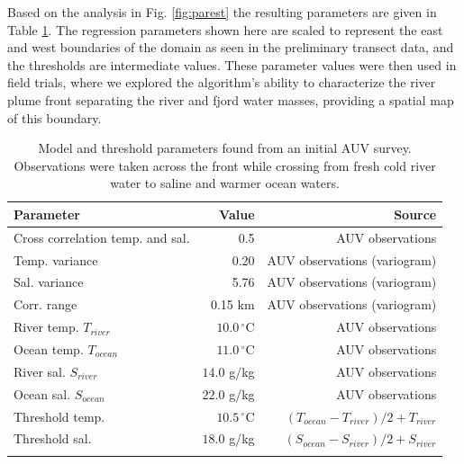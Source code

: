 \documentclass[aoas]{imsart}
\begin{document}
Based on the analysis in Fig. \ref{fig:parest} the resulting parameters are given in Table \ref{tab:experiment_param}. The regression parameters shown here are scaled to represent the east and west boundaries of the domain as seen in the preliminary transect data, and the thresholds are intermediate values. These parameter values were then used in field trials, where we explored the algorithm's ability to characterize the river plume front separating the river and fjord water masses, providing a spatial map of this boundary. 


\begin{table}[!h]
\centering
\begin{tabular}{lrr}
\toprule
Parameter & Value & Source\\
\midrule
\rowcolor{Gray}
Cross correlation temp. and sal. & 0.5 & AUV observations\\
Temp. variance &  0.20 & AUV observations (variogram)\\
\rowcolor{Gray}
Sal. variance &  5.76 & AUV observations (variogram)\\
Corr. range  & 0.15 km & AUV observations (variogram)\\
\rowcolor{Gray}
River temp. $T_{river}$ & $10.0\,^{\circ}\mathrm{C}$ & AUV observations\\
Ocean temp. $T_{ocean}$ & $11.0\,^{\circ}\mathrm{C}$ & AUV observations\\
\rowcolor{Gray}
River sal. $S_{river}$ & $14.0$ g/kg & AUV observations\\
Ocean sal. $S_{ocean}$ & $22.0$ g/kg & AUV observations\\
\rowcolor{Gray}
Threshold temp. & $10.5\,^{\circ}\mathrm{C}$ & $(T_{ocean}-T_{river})/2+T_{river}$\\
Threshold sal. & $18.0$ g/kg & $(S_{ocean}-S_{river})/2+S_{river}$\\
\rowcolor{Gray}
\bottomrule
\end{tabular}
\caption{Model and threshold parameters found from an initial AUV
  survey. Observations were taken across the front while crossing from
  fresh cold river water to saline and warmer ocean waters.}
\label{tab:experiment_param}
\end{table}
\end{document}
